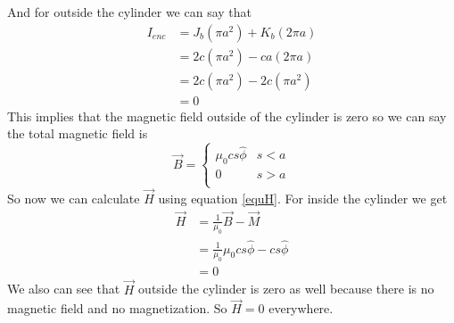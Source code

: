 \documentclass[11pt]{article}
\numberwithin{equation}{section}
\begin{document}
And for outside the cylinder we can say that 
\begin{align*}
I_{enc} &= J_b(\pi a^2)+{K_b}(2\pi a)\\
&= 2c(\pi a^2)-ca(2\pi a)\\
&= 2c(\pi a^2)-2c(\pi a^2)\\
&= 0
\end{align*}
This implies that the magnetic field outside of the cylinder is zero so we can say the total magnetic field is
$$\vec{B} = \left\{\begin{array}{lc}
	\mu_0cs\hat{\phi}	&s<a\\
	0			&s>a\\
		\end{array}\right.$$
So now we can calculate $\vec{H}$ using equation \ref{equH}. For inside the cylinder we get
\begin{align*}
\vec{H} &= \frac{1}{\mu_0}\vec{B}-\vec{M}\\
&= \frac{1}{\mu_0}\mu_0cs\hat{\phi}-cs\hat{\phi}\\
&= 0
\end{align*}
We also can see that $\vec{H}$ outside the cylinder is zero as well because there is no magnetic field and no magnetization. So $\vec{H} = 0$ everywhere.
\end{document}
